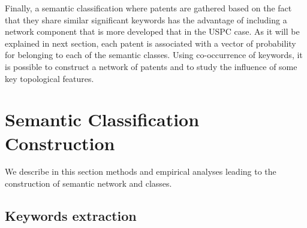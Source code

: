 \documentclass[10pt,A4]{article}
\begin{document}
Finally, a semantic classification where patents are gathered based on the fact that they share similar significant keywords has the advantage of including a network component that is more developed that in the USPC case. As it will be explained in next section, each patent is associated with a vector of probability for belonging to each of the semantic classes. Using co-occurrence of keywords, it is possible to construct a network of patents and to study the influence of some key topological features.

\section{Semantic Classification Construction \label{keywords}}

We describe in this section methods and empirical analyses leading to the construction of semantic network and classes. 

\subsection{Keywords extraction}
\end{document}
